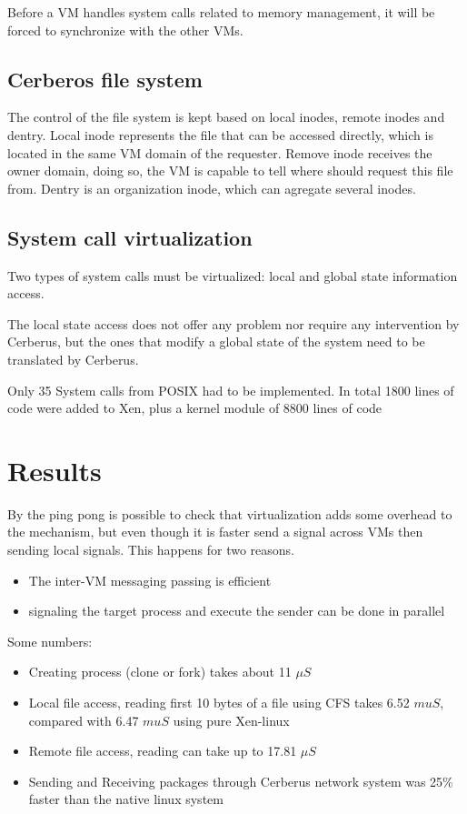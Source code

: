 \documentclass[journal]{IEEEtran}
\begin{document}
\begin{itemize}
	Before a VM handles system calls related to memory management, it will be forced to synchronize with the other VMs.
	
	\subsection{Cerberos file system}
	
	The control of the file system is kept based on local inodes, remote inodes and dentry. Local inode represents the file that can be accessed directly, which is located in the same VM domain of the requester. Remove inode receives the owner domain, doing so, the VM is capable to tell where should request this file from. Dentry is an organization inode, which can agregate several inodes.

	\subsection{System call virtualization}

	Two types of system calls must be virtualized: local and global state information access.
	
	The local state access does not offer any problem nor require any intervention by Cerberus, but the ones that modify a global state of the system need to be translated by Cerberus.
	
	Only 35 System calls from POSIX had to be implemented. In total 1800 lines of code were added to Xen, plus a kernel module of 8800 lines of code %
	
	\section{Results}
	
	By the ping pong is possible to check that virtualization adds some overhead to the mechanism, but even though it is faster send a signal across VMs then sending local signals. This happens for two reasons.
	\begin{itemize}
	\item The inter-VM messaging passing is efficient
	\item signaling the target process and execute the sender can be done in parallel
	\end{itemize}
	
	Some numbers:
	\begin{itemize}
	\item Creating process (clone or fork) takes about 11 $\mu S$ %
	\item Local file access, reading first 10 bytes of a file using CFS takes 6.52 $mu S$, compared with 6.47 $mu S$ using pure Xen-linux
	\item Remote file access, reading can take up to 17.81 $\mu S$
	\item Sending and Receiving packages through Cerberus network system was 25\% faster than the native linux system
	

\end{itemize}
\end{itemize}
\end{document}
